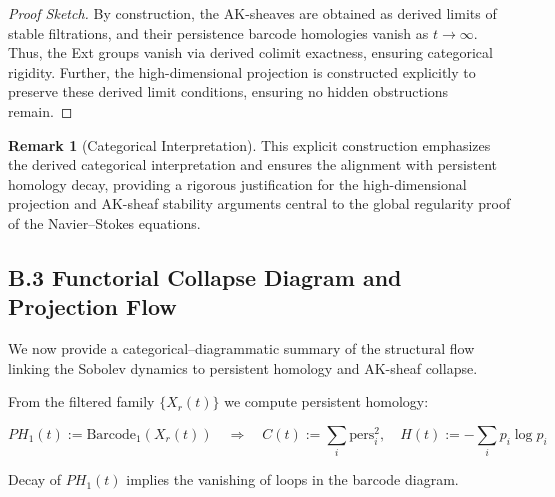 \documentclass[11pt]{article}
\theoremstyle{definition}
\newtheorem{remark}[theorem]{Remark}
\begin{document}
\begin{proof}[Proof Sketch]
By construction, the AK-sheaves are obtained as derived limits of stable filtrations, and their persistence barcode homologies vanish as \( t\rightarrow \infty \). Thus, the Ext groups vanish via derived colimit exactness, ensuring categorical rigidity. Further, the high-dimensional projection is constructed explicitly to preserve these derived limit conditions, ensuring no hidden obstructions remain.
\end{proof}

\begin{remark}[Categorical Interpretation]
This explicit construction emphasizes the derived categorical interpretation and ensures the alignment with persistent homology decay, providing a rigorous justification for the high-dimensional projection and AK-sheaf stability arguments central to the global regularity proof of the Navier--Stokes equations.
\end{remark}

\subsection*{B.3 Functorial Collapse Diagram and Projection Flow}

We now provide a categorical–diagrammatic summary of the structural flow linking the Sobolev dynamics to persistent homology and AK-sheaf collapse.

\begin{center}
\end{center}

\vspace{0.5em}

From the filtered family $\{X_r(t)\}$ we compute persistent homology:

\[
PH_1(t) := \text{Barcode}_1(X_r(t))
\quad \Rightarrow \quad
C(t) := \sum_i \text{pers}_i^2, \quad H(t) := - \sum_i p_i \log p_i
\]

Decay of $PH_1(t)$ implies the vanishing of loops in the barcode diagram.

\vspace{1em}
\end{document}
